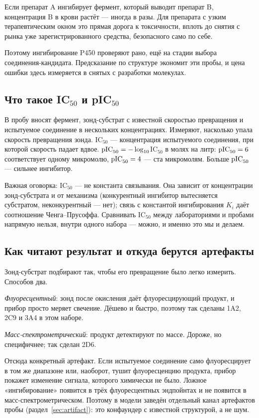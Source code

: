 Если препарат A ингибирует фермент, который выводит препарат B, концентрация B в крови растёт ---
иногда в разы. Для препарата с узким терапевтическим окном это прямая дорога к токсичности, вплоть
до снятия с рынка уже зарегистрированного средства, безопасного само по себе.

Поэтому ингибирование P450 проверяют рано, ещё на стадии выбора соединения-кандидата. Предсказание
по структуре экономит эти пробы, и цена ошибки здесь измеряется в снятых с разработки молекулах.

\subsection{Что такое IC$_{50}$ и pIC$_{50}$}

В пробу вносят фермент, зонд-субстрат с известной скоростью превращения и испытуемое соединение
в нескольких концентрациях. Измеряют, насколько упала скорость превращения зонда. IC$_{50}$ ---
концентрация испытуемого соединения, при которой скорость падает вдвое. $\mathrm{pIC}_{50} = -\log_{10}$IC$_{50}$
в молях на литр: $\mathrm{pIC}_{50} = 6$ соответствует одному микромолю, $\mathrm{pIC}_{50} = 4$ --- ста микромолям. Больше $\mathrm{pIC}_{50}$ ---
сильнее ингибитор.

Важная оговорка: IC$_{50}$ --- не константа связывания. Она зависит от концентрации зонд-субстрата
и от механизма (конкурентный ингибитор вытесняется субстратом, неконкурентный --- нет); связь
с константой ингибирования $K_i$ даёт соотношение Ченга--Прусоффа. Сравнивать IC$_{50}$ между
лабораториями и пробами напрямую нельзя, внутри одного набора --- можно, и именно это мы и делаем.

\subsection{Как читают результат и откуда берутся артефакты}

Зонд-субстрат подбирают так, чтобы его превращение было легко измерить. Способов два.

\emph{Флуоресцентный}: зонд после окисления даёт флуоресцирующий продукт, и прибор просто меряет
свечение. Дёшево и быстро, поэтому так сделаны 1A2, 2C9 и 3A4 в этом наборе.

\emph{Масс-спектрометрический}: продукт детектируют по массе. Дороже, но специфичнее; так сделан 2D6.

Отсюда конкретный артефакт. Если испытуемое соединение само флуоресцирует в том же диапазоне или,
наоборот, тушит флуоресценцию продукта, прибор покажет изменение сигнала, которого химически не было.
Ложное «ингибирование» появится в трёх флуоресцентных эндпойнтах и не появится в масс-спектрометрическом.
Поэтому в модели заведён отдельный канал артефактов пробы (раздел~\ref{sec:artifact}): это конфаундер с известной
структурой, а не шум.

